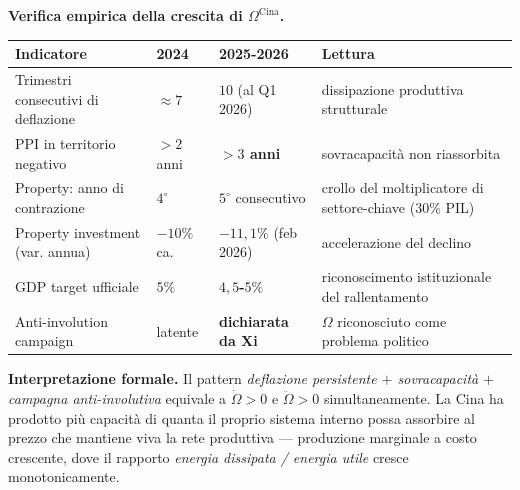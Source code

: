 \Proved{} \textbf{Verifica empirica della crescita di
\(\Omega^{\text{Cina}}\).}

{\def\LTcaptype{none} %
{\small\begin{longtable}[]{@{}
  >{\raggedright\arraybackslash}p{}
  >{\raggedright\arraybackslash}p{}
  >{\raggedright\arraybackslash}p{}
  >{\raggedright\arraybackslash}p{}@{}}
\toprule\noalign{}
\begin{minipage}[b]{\linewidth}\raggedright
Indicatore
\end{minipage} & \begin{minipage}[b]{\linewidth}\raggedright
2024
\end{minipage} & \begin{minipage}[b]{\linewidth}\raggedright
2025-2026
\end{minipage} & \begin{minipage}[b]{\linewidth}\raggedright
Lettura
\end{minipage} \\
\midrule\noalign{}
\endhead
\bottomrule\noalign{}
\endlastfoot
Trimestri consecutivi di deflazione & \(\approx 7\) & \textbf{\(10\)}
(al Q1 2026) & dissipazione produttiva strutturale \\
PPI in territorio negativo & \(> 2\) anni & \textbf{\(> 3\) anni} &
sovracapacità non riassorbita \\
Property: anno di contrazione & \(4^\circ\) & \textbf{\(5^\circ\)} consecutivo &
crollo del moltiplicatore di settore-chiave (30\% PIL) \\
Property investment (var. annua) & \(-10\%\) ca. &
\textbf{\(-11{,}1\%\)} (feb 2026) & accelerazione del declino \\
GDP target ufficiale & \(5\%\) & \textbf{\(4{,}5\)-\(5\%\)} &
riconoscimento istituzionale del rallentamento \\
Anti-involution campaign & latente & \textbf{dichiarata da Xi} &
\(\Omega\) riconosciuto come problema politico \\
\end{longtable}}
}

\Hypoth{} \textbf{Interpretazione formale.} Il pattern \emph{deflazione
persistente \(+\) sovracapacità \(+\) campagna anti-involutiva} equivale
a \(\dot\Omega > 0\) e \(\ddot\Omega > 0\) simultaneamente. La Cina ha
prodotto più capacità di quanta il proprio sistema interno possa
assorbire al prezzo che mantiene viva la rete produttiva --- produzione
marginale a costo crescente, dove il rapporto \emph{energia dissipata /
energia utile} cresce monotonicamente.

